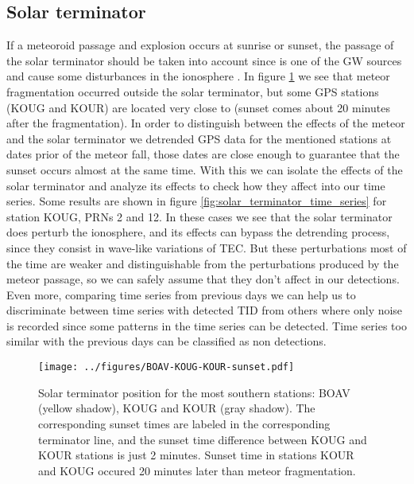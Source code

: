 \subsection{Solar terminator}

If a meteoroid passage and explosion occurs at sunrise or sunset, the passage of the solar terminator should be taken into account since is one of the GW sources and cause some disturbances in the ionosphere \citep{Somsikov:2011}. In figure \ref{fig:solar_terminator} we see that meteor fragmentation occurred outside the solar terminator, but some GPS stations (KOUG and KOUR) are located very close to (sunset comes about 20 minutes after the fragmentation). In order to distinguish between the effects of the meteor and the solar terminator we detrended GPS data for the mentioned stations at dates prior of the meteor fall, those dates are close enough to guarantee that the sunset occurs almost at the same time. With this we can isolate the effects of the solar terminator and analyze its effects to check how they affect into our time series. Some results are shown in figure \ref{fig:solar_terminator_time_series} for station KOUG, PRNs 2 and 12. In these cases we see that the solar terminator does perturb the ionosphere, and its effects can bypass the detrending process, since they consist in wave-like variations of TEC. But these perturbations most of the time are weaker and distinguishable from the perturbations produced by the meteor passage, so we can safely assume that they don't affect in our detections. Even more, comparing time series from previous days we can help us to discriminate between time series with detected TID from others where only noise is recorded since some patterns in the time series can be detected. Time series too similar with the previous days can be classified as non detections.

\begin{figure}
    \centering
    \texttt{[image: ../figures/BOAV-KOUG-KOUR-sunset.pdf]}
    \caption{Solar terminator position for the most southern stations: BOAV (yellow shadow), KOUG and KOUR (gray shadow). The corresponding sunset times are labeled in the corresponding terminator line, and the sunset time difference between KOUG and KOUR stations is just 2 minutes. Sunset time in stations KOUR and KOUG occured 20 minutes later than meteor fragmentation.}
    \label{fig:solar_terminator}
\end{figure}

